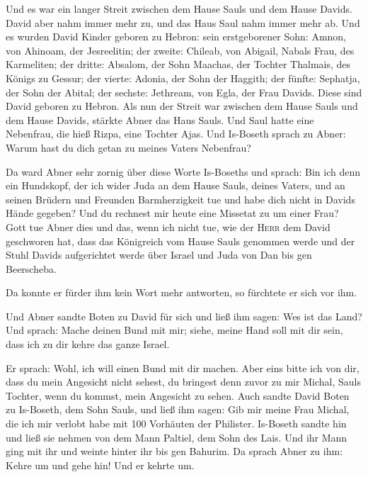  Und es war ein langer Streit zwischen dem Hause Sauls und
dem Hause Davids. David aber nahm immer mehr zu, und das Haus Saul nahm
immer mehr ab.  Und es wurden David Kinder geboren zu
Hebron: sein erstgeborener Sohn: Amnon, von Ahinoam, der Jesreelitin;
 der zweite: Chileab, von Abigail, Nabals Frau, des
Karmeliten; der dritte: Absalom, der Sohn Maachas, der Tochter Thalmais,
des Königs zu Gessur;  der vierte: Adonia, der Sohn der
Haggith; der fünfte: Sephatja, der Sohn der Abital;  der
sechste: Jethream, von Egla, der Frau Davids. Diese sind David geboren
zu Hebron.  Als nun der Streit war zwischen dem Hause
Sauls und dem Hause Davids, stärkte Abner das Haus Sauls. 
Und Saul hatte eine Nebenfrau, die hieß Rizpa, eine Tochter Ajas. Und
Is-Boseth sprach zu Abner: Warum hast du dich getan zu meines Vaters
Nebenfrau?

 Da ward Abner sehr zornig über diese Worte Is-Boseths und
sprach: Bin ich denn ein Hundskopf, der ich wider Juda an dem Hause
Sauls, deines Vaters, und an seinen Brüdern und Freunden Barmherzigkeit
tue und habe dich nicht in Davids Hände gegeben? Und du rechnest mir
heute eine Missetat zu um einer Frau?  Gott tue Abner dies
und das, wenn ich nicht tue, wie der \textsc{Herr} dem David geschworen
hat,  dass das Königreich vom Hause Sauls genommen werde
und der Stuhl Davids aufgerichtet werde über Israel und Juda von Dan bis
gen Beerscheba.

 Da konnte er fürder ihm kein Wort mehr antworten, so
fürchtete er sich vor ihm.

 Und Abner sandte Boten zu David für sich und ließ ihm
sagen: Wes ist das Land? Und sprach: Mache deinen Bund mit mir; siehe,
meine Hand soll mit dir sein, dass ich zu dir kehre das ganze Israel.

 Er sprach: Wohl, ich will einen Bund mit dir machen.
Aber eins bitte ich von dir, dass du mein Angesicht nicht sehest, du
bringest denn zuvor zu mir Michal, Sauls Tochter, wenn du kommst, mein
Angesicht zu sehen.  Auch sandte David Boten zu
Is-Boseth, dem Sohn Sauls, und ließ ihm sagen: Gib mir meine Frau
Michal, die ich mir verlobt habe mit 100 Vorhäuten der Philister.
 Is-Boseth sandte hin und ließ sie nehmen von dem Mann
Paltiel, dem Sohn des Lais.  Und ihr Mann ging mit ihr
und weinte hinter ihr bis gen Bahurim. Da sprach Abner zu ihm: Kehre um
und gehe hin! Und er kehrte um.

